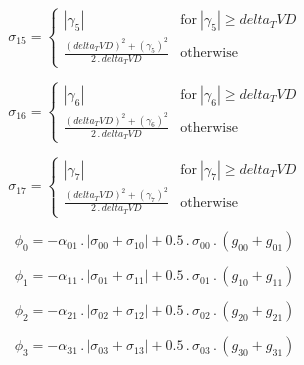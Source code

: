 \documentclass{article}
\begin{document}
\begin{dmath}\sigma_{1 5} = \begin{cases} \left|{\gamma_{5}}\right| & \text{for}\: \left|{\gamma_{5}}\right| \geq delta_TVD \\\frac{\left(delta_TVD \right)^{2} + \left(\gamma_{5} \right)^{2}}{2 \,.\, delta_TVD} & \text{otherwise} 
\end{cases}\end{dmath}

\begin{dmath}\sigma_{1 6} = \begin{cases} \left|{\gamma_{6}}\right| & \text{for}\: \left|{\gamma_{6}}\right| \geq delta_TVD \\\frac{\left(delta_TVD \right)^{2} + \left(\gamma_{6} \right)^{2}}{2 \,.\, delta_TVD} & \text{otherwise} 
\end{cases}\end{dmath}

\begin{dmath}\sigma_{1 7} = \begin{cases} \left|{\gamma_{7}}\right| & \text{for}\: \left|{\gamma_{7}}\right| \geq delta_TVD \\\frac{\left(delta_TVD \right)^{2} + \left(\gamma_{7} \right)^{2}}{2 \,.\, delta_TVD} & \text{otherwise} 
\end{cases}\end{dmath}

\begin{dmath}\phi_{0} = - \alpha_{01} \,.\, \left|{\sigma_{0 0} + \sigma_{1 0}}\right| + 0.5 \,.\, \sigma_{0 0} \,.\, \left(g_{00} + g_{01}\right)\end{dmath}

\begin{dmath}\phi_{1} = - \alpha_{11} \,.\, \left|{\sigma_{0 1} + \sigma_{1 1}}\right| + 0.5 \,.\, \sigma_{0 1} \,.\, \left(g_{10} + g_{11}\right)\end{dmath}

\begin{dmath}\phi_{2} = - \alpha_{21} \,.\, \left|{\sigma_{0 2} + \sigma_{1 2}}\right| + 0.5 \,.\, \sigma_{0 2} \,.\, \left(g_{20} + g_{21}\right)\end{dmath}

\begin{dmath}\phi_{3} = - \alpha_{31} \,.\, \left|{\sigma_{0 3} + \sigma_{1 3}}\right| + 0.5 \,.\, \sigma_{0 3} \,.\, \left(g_{30} + g_{31}\right)\end{dmath}
\end{document}
